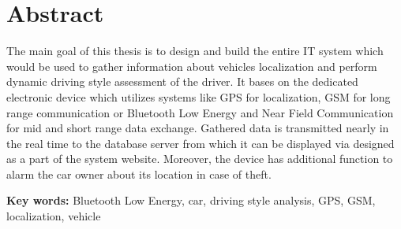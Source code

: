 \chapter*{Abstract}
{
\flushbottom


\begin{singlespacing}


The main goal of this thesis is to design and build the entire IT system which would be used to gather information about vehicles localization and perform dynamic driving style assessment of the driver. It bases on the dedicated electronic device which utilizes systems like GPS for localization, GSM for long range communication or Bluetooth Low Energy and Near Field Communication for mid and short range data exchange. Gathered data is transmitted nearly in the real time to the database server from which it can be displayed via designed as a part of the system website. Moreover, the device has additional function to alarm the car owner about its location in case of theft.

\flushbottom
\textbf{Key words: }Bluetooth Low Energy, car, driving style analysis, GPS, GSM, localization, vehicle
\end{singlespacing}
}